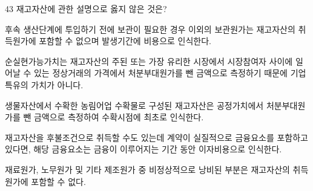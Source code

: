 \begin{question}{43}
재고자산에 관한 설명으로 옳지 않은 것은?
\begin{choices}
  \item 후속 생산단계에 투입하기 전에 보관이 필요한 경우 이외의 보관원가는 재고자산의 취득원가에 포함할 수 없으며 발생기간에 비용으로 인식한다.
  \item 순실현가능가치는 재고자산의 주된 또는 가장 유리한 시장에서 시장참여자 사이에 일어날 수 있는 정상거래의 가격에서 처분부대원가를 뺀 금액으로 측정하기 때문에 기업특유의 가치가 아니다.
  \item 생물자산에서 수확한 농림어업 수확물로 구성된 재고자산은 공정가치에서 처분부대원가를 뺀 금액으로 측정하여 수확시점에 최초로 인식한다.
  \item 재고자산을 후불조건으로 취득할 수도 있는데 계약이 실질적으로 금융요소를 포함하고 있다면, 해당 금융요소는 금융이 이루어지는 기간 동안 이자비용으로 인식한다.
  \item 재료원가, 노무원가 및 기타 제조원가 중 비정상적으로 낭비된 부분은 재고자산의 취득원가에 포함할 수 없다.
\end{choices}
\end{question}
